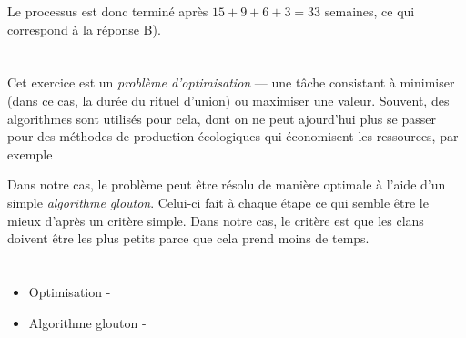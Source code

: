 {{Le processus est donc terminé après ${15+9+6+3=33}$ semaines, ce qui correspond à la réponse B).

{\centering%
\par}



\section*{\BrochureItsInformatics}
Cet exercice est un \emph{problème d’optimisation} — une tâche consistant à minimiser (dans ce cas, la durée du rituel d’union) ou maximiser une valeur. Souvent, des algorithmes sont utilisés pour cela, dont on ne peut ajourd’hui plus se passer pour des méthodes de production écologiques qui économisent les ressources, par exemple

Dans notre cas, le problème peut être résolu de manière optimale à l’aide d’un simple \emph{algorithme glouton}. Celui-ci fait à chaque étape ce qui semble être le mieux d’après un critère simple. Dans notre cas, le critère est que les clans doivent être les plus petits parce que cela prend moins de temps.



\section*{\BrochureWebsitesAndKeywords}
{\raggedright
\begin{itemize}
  \item Optimisation - \href{https://fr.wikipedia.org/wiki/Optimisation_(math\%C3\%A9matiques)}{}
  \item Algorithme glouton - \href{https://fr.wikipedia.org/wiki/Algorithme_glouton}{}
\end{itemize}


}

}{}

}

